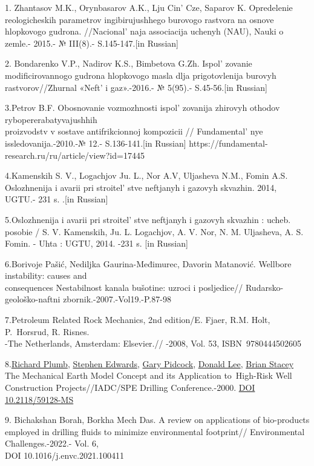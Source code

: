 \begin{references}

1. Zhantasov M.K., Orynbasarov A.K., Lju Cin'{} Cze,
Saparov K. Opredelenie reologicheskih parametrov ingibirujushhego
burovogo rastvora na osnove hlopkovogo gudrona.
//Nacional' naja associacija uchenyh (NAU), Nauki o
zemle.- 2015.- № III(8).- S.145-147.{[}in Russian{]}

2. Bondarenko V.P., Nadirov K.S., Bimbetova G.Zh.
Ispol' zovanie modificirovannogo gudrona hlopkovogo masla
dlja prigotovlenija burovyh rastvorov//Zhurnal «Neft'{} i
gaz».-2016.- № 5(95).- S.45-56.{[}in Russian{]}

3.Petrov B.F. Obosnovanie vozmozhnosti ispol' zovanija
zhirovyh othodov rybopererabatyvajushhih \\proizvodstv v sostave
antifrikcionnoj kompozicii // Fundamental' nye
issledovanija.-2010.-№ 12.- S.136-141.{[}in Russian{]}
https://fundamental-research.ru/ru/article/view?id=17445

4.Kamenskih S. V., Logachjov Ju. L., Nor A.V, Uljasheva N.M., Fomin A.S.
Oslozhnenija i avarii pri stroitel' stve neftjanyh i
gazovyh skvazhin. 2014, UGTU.- 231 s. .{[}in Russian{]}

5.Oslozhnenija i avarii pri stroitel' stve neftjanyh i
gazovyh skvazhin : ucheb. posobie / S. V. Kamenskih, Ju. L. Logachjov,
A. V. Nor, N. M. Uljasheva, A. S. Fomin. - Uhta : UGTU, 2014. -231 s.
{[}in Russian{]}

6.Borivoje Pašić, Nediljka Gaurina-Međimurec, Davorin Matanović.
Wellbore instability: causes and \\consequences Nestabilnost kanala
bušotine: uzroci i posljedice// Rudarsko-geološko-naftni
zbornik.-2007.-Vol19.-P.87-98

7.Petroleum Related Rock Mechanics, 2nd edition/E. Fjaer, R.M. Holt,
P.~Horsrud, R. Risnes. \\-The Netherlands, Amsterdam: Elsevier.// -2008,
Vol. 53, ISBN~9780444502605

8.\href{javascript:;}{Richard Plumb}, \href{javascript:;}{Stephen
Edwards}, \href{javascript:;}{Gary Pidcock}, \href{javascript:;}{Donald
Lee}, \href{javascript:;}{Brian Stacey} The Mechanical Earth Model
Concept and its Application to~High-Risk Well Construction
Projects//IADC/SPE Drilling Conference.-2000.
\href{https://doi.org/10.2118/59128-MS}{DOI 10.2118/59128-MS}

9. Bichakshan Borah, Borkha Mech Das. A review on applications of
bio-products employed in drilling fluids to minimize environmental
footprint// Environmental Challenges.-2022.- Vol. 6, \\DOI
10.1016/j.envc.2021.100411


\end{references}
